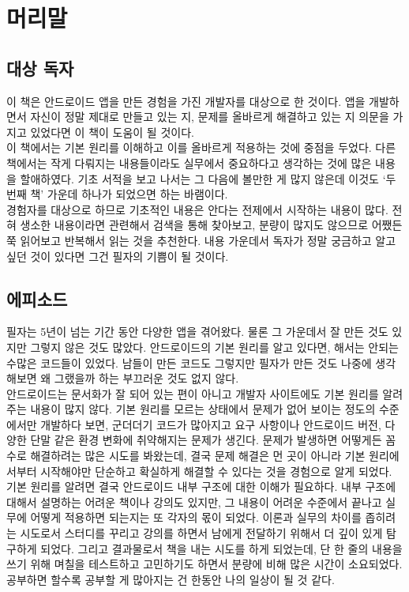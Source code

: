 \chapter*{머리말}
\section*{대상 독자}
이 책은 안드로이드 앱을 만든 경험을 가진 개발자를 대상으로 한 것이다. 
앱을 개발하면서 자신이 정말 제대로 만들고 있는 지, 문제를 올바르게 해결하고 있는 지 의문을 가지고 있었다면 이 책이 도움이 될 것이다.\\

이 책에서는 기본 원리를 이해하고 이를 올바르게 적용하는 것에 중점을 두었다. 
다른 책에서는 작게 다뤄지는 내용들이라도 실무에서 중요하다고 생각하는 것에 많은 내용을 할애하였다.
기초 서적을 보고 나서는 그 다음에 볼만한 게 많지 않은데 이것도 `두 번째 책' 가운데 하나가 되었으면 하는 바램이다.\\

경험자를 대상으로 하므로 기초적인 내용은 안다는 전제에서 시작하는 내용이 많다. 
전혀 생소한 내용이라면 관련해서 검색을 통해 찾아보고, 분량이 많지도 않으므로 어쨌든 쭉 읽어보고 반복해서 읽는 것을 추천한다. 
내용 가운데서 독자가 정말 궁금하고 알고 싶던 것이 있다면 그건 필자의 기쁨이 될 것이다.

\section*{에피소드}
필자는 5년이 넘는 기간 동안 다양한 앱을 겪어왔다. 물론 그 가운데서 잘 만든 것도 있지만 그렇지 않은 것도 많았다. 
안드로이드의 기본 원리를 알고 있다면, 해서는 안되는 수많은 코드들이 있었다.
남들이 만든 코드도 그렇지만 필자가 만든 것도 나중에 생각해보면 왜 그랬을까 하는 부끄러운 것도 없지 않다.\\

안드로이드는 문서화가 잘 되어 있는 편이 아니고 개발자 사이트에도 기본 원리를 알려주는 내용이 많지 않다. 
기본 원리를 모르는 상태에서 문제가 없어 보이는 정도의 수준에서만 개발하다 보면, 군더더기 코드가 많아지고 요구 사항이나 안드로이드 버전, 다양한 단말 같은 환경 변화에 취약해지는 문제가 생긴다.
문제가 발생하면 어떻게든 꼼수로 해결하려는 많은 시도를 봐왔는데, 결국 문제 해결은 먼 곳이 아니라 기본 원리에서부터 시작해야만
단순하고 확실하게 해결할 수 있다는 것을 경험으로 알게 되었다.\\

기본 원리를 알려면 결국 안드로이드 내부 구조에 대한 이해가 필요하다.
내부 구조에 대해서 설명하는 어려운 책이나 강의도 있지만, 
그 내용이 어려운 수준에서 끝나고 실무에 어떻게 적용하면 되는지는 또 각자의 몫이 되었다. 
이론과 실무의 차이를 좁히려는 시도로서 스터디를 꾸리고 강의를 하면서 
남에게 전달하기 위해서 더 깊이 있게 탐구하게 되었다.
그리고 결과물로서 책을 내는 시도를 하게 되었는데, 단 한 줄의 내용을 쓰기 위해 며칠을 테스트하고 고민하기도 하면서 분량에 비해 많은 시간이 소요되었다.
공부하면 할수록 공부할 게 많아지는 건 한동안 나의 일상이 될 것 같다.

